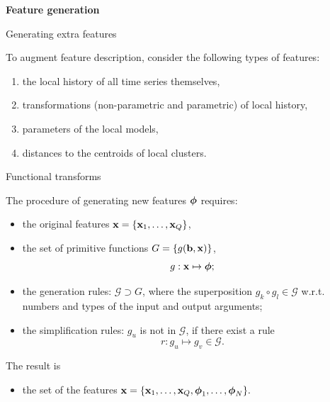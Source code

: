 \documentclass{beamer}
\begin{document}
\begin{frame}
\vfill
\begin{center}
{\Large \bf Feature generation}
\end{center}
\vfill
\end{frame}
\begin{frame}{Generating extra features}

To augment feature description, consider the following types of features:
\begin{enumerate}[1)]
\item the local history of all time series themselves,
\item transformations (non-parametric and parametric) of local history,
\item parameters of the local models,
\item distances to the centroids of local clusters.
\end{enumerate}

\end{frame}
\begin{frame}{Functional transforms}

The procedure of generating new features ${\boldsymbol{\phi}}$ requires:
\begin{itemize}
\item the original features ${\mathbf{x}} = \{{\mathbf{x}}_1, \dots, {\mathbf{x}}_Q\}$,
\item the set of primitive functions $G = \{g(\mathbf{b},{\mathbf{x}})\}$,
    $$g:{\mathbf{x}} \mapsto {\boldsymbol{\phi}};$$
\item the generation rules: $\mathcal{G}\supset G$, where the superposition $g_k\circ g_l \in \mathcal{G}$ w.r.t. numbers and types of the input and output arguments;
\item the simplification rules: $g_u$ is not in $\mathcal{G}$, if there exist a rule
$$
r:g_u \mapsto g_v \in \mathcal{G}.
$$
\end{itemize}


\bigskip
The result is
\begin{itemize}
\item[] the set of the features ${\mathbf{x}}=\{\mathbf{x}_1,\dots,\mathbf{x}_{Q},{\boldsymbol{\phi}}_{1},\dots,{\boldsymbol{\phi}}_N\}.$
\end{itemize}

\end{frame}
\end{document}
